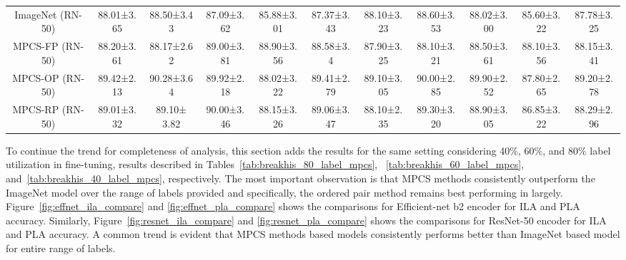 \documentclass[conference]{IEEEtran}
\begin{document}
\begin{table*}[h!t]
\begin{adjustbox}{max width=\textwidth}
\begin{tabular}{c|cccc|c|cccc|c}
ImageNet (RN-50)         & \multicolumn{1}{c|}{88.01±3.65} & \multicolumn{1}{c|}{88.50±3.43}                         & \multicolumn{1}{c|}{87.09±3.62}                        & 85.88±3.01                        & 87.37±3.43             & \multicolumn{1}{c|}{88.10±3.23} & \multicolumn{1}{c|}{88.60±3.53} & \multicolumn{1}{c|}{88.02±3.00} & 85.60±3.22 & 87.78±3.25             \\
MPCS-FP (RN-50)          & \multicolumn{1}{c|}{88.20±3.61} & \multicolumn{1}{c|}{88.17±2.62}                         & \multicolumn{1}{c|}{89.00±3.81}                        & 88.90±3.56                        & 88.58±3.4              & \multicolumn{1}{c|}{87.90±3.25} & \multicolumn{1}{c|}{88.10±3.21} & \multicolumn{1}{c|}{88.50±3.61} & 88.10±3.56 & 88.15±3.41             \\
MPCS-OP (RN-50)          & \multicolumn{1}{c|}{89.42±2.13} & \multicolumn{1}{c|}{90.28±3.64}                         & \multicolumn{1}{c|}{{\color[HTML]{1E1E1E} 89.92±2.18}} & {\color[HTML]{1E1E1E} 88.02±3.22} & 89.41±2.79             & \multicolumn{1}{c|}{89.10±3.05} & \multicolumn{1}{c|}{90.00±2.85} & \multicolumn{1}{c|}{89.90±2.52} & 87.80±2.65 & 89.20±2.78             \\
MPCS-RP (RN-50)          & \multicolumn{1}{c|}{89.01±3.32} & \multicolumn{1}{c|}{{\color[HTML]{1E1E1E} 89.10± 3.82}} & \multicolumn{1}{c|}{{\color[HTML]{1E1E1E} 90.00±3.46}} & {\color[HTML]{1E1E1E} 88.15±3.26} & 89.06±3.47             & \multicolumn{1}{c|}{88.10±2.35} & \multicolumn{1}{c|}{89.30±3.20} & \multicolumn{1}{c|}{88.90±3.05} & 86.85±3.22 & 88.29±2.96             \\ \hline
\end{tabular}
\end{adjustbox}
\end{table*} To continue the trend for completeness of analysis, this section adds the results for the same setting considering 40\%, 60\%, and 80\% label utilization in fine-tuning, results described in Tables~\ref{tab:breakhis_80_label_mpcs}, ~\ref{tab:breakhis_60_label_mpcs}, and~\ref{tab:breakhis_40_label_mpcs}, respectively. The most important observation is that MPCS methods consistently outperform the ImageNet model over the range of labels provided and specifically, the ordered pair method remains best performing in largely. Figure~\ref{fig:effnet_ila_compare} and \ref{fig:effnet_pla_compare} shows the comparisons for Efficient-net b2 encoder for ILA and PLA accuracy. Similarly, Figure~\ref{fig:resnet_ila_compare} and \ref{fig:resnet_pla_compare} shows the comparisons for ResNet-50 encoder for ILA and PLA accuracy. A common trend is evident that MPCS methods based models consistently performs better than ImageNet based model for entire range of labels.
\end{document}
